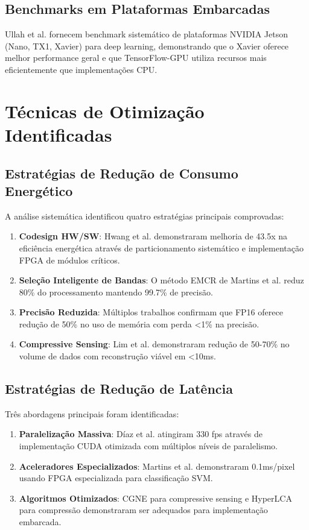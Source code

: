 \subsection{Benchmarks em Plataformas Embarcadas}

Ullah et al. \cite{ullah2020} fornecem benchmark sistemático de plataformas NVIDIA Jetson (Nano, TX1, Xavier) para deep learning, demonstrando que o Xavier oferece melhor performance geral e que TensorFlow-GPU utiliza recursos mais eficientemente que implementações CPU.

\section{Técnicas de Otimização Identificadas}

\subsection{Estratégias de Redução de Consumo Energético}

A análise sistemática identificou quatro estratégias principais comprovadas:

\begin{enumerate}
\item \textbf{Codesign HW/SW}: Hwang et al. demonstraram melhoria de 43.5x na eficiência energética através de particionamento sistemático e implementação FPGA de módulos críticos.

\item \textbf{Seleção Inteligente de Bandas}: O método EMCR de Martins et al. reduz 80\% do processamento mantendo 99.7\% de precisão.

\item \textbf{Precisão Reduzida}: Múltiplos trabalhos confirmam que FP16 oferece redução de 50\% no uso de memória com perda <1\% na precisão.

\item \textbf{Compressive Sensing}: Lim et al. demonstraram redução de 50-70\% no volume de dados com reconstrução viável em <10ms.
\end{enumerate}

\subsection{Estratégias de Redução de Latência}

Três abordagens principais foram identificadas:

\begin{enumerate}
\item \textbf{Paralelização Massiva}: Díaz et al. atingiram 330 fps através de implementação CUDA otimizada com múltiplos níveis de paralelismo.

\item \textbf{Aceleradores Especializados}: Martins et al. demonstraram 0.1ms/pixel usando FPGA especializada para classificação SVM.

\item \textbf{Algoritmos Otimizados}: CGNE para compressive sensing e HyperLCA para compressão demonstraram ser adequados para implementação embarcada.
\end{enumerate}

